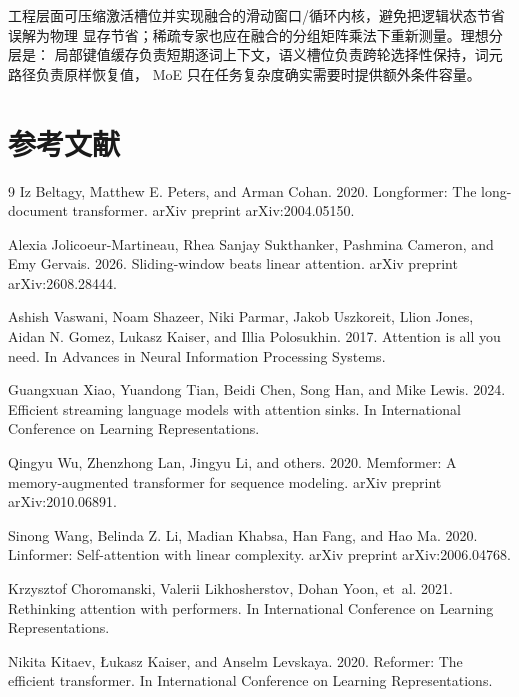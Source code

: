 \documentclass[letterpaper]{article}
\begin{document}
工程层面可压缩激活槽位并实现融合的滑动窗口/循环内核，避免把逻辑状态节省误解为物理
显存节省；稀疏专家也应在融合的分组矩阵乘法下重新测量。理想分层是：
局部键值缓存负责短期逐词上下文，语义槽位负责跨轮选择性保持，词元路径负责原样恢复值，
MoE 只在任务复杂度确实需要时提供额外条件容量。

\section*{参考文献}

\begin{thebibliography}{9}
Iz Beltagy, Matthew E. Peters, and Arman Cohan. 2020. Longformer: The long-document transformer. arXiv preprint arXiv:2004.05150.

Alexia Jolicoeur-Martineau, Rhea Sanjay Sukthanker, Pashmina Cameron, and Emy Gervais. 2026. Sliding-window beats linear attention. arXiv preprint arXiv:2608.28444.

Ashish Vaswani, Noam Shazeer, Niki Parmar, Jakob Uszkoreit, Llion Jones, Aidan N. Gomez, Lukasz Kaiser, and Illia Polosukhin. 2017. Attention is all you need. In Advances in Neural Information Processing Systems.

Guangxuan Xiao, Yuandong Tian, Beidi Chen, Song Han, and Mike Lewis. 2024. Efficient streaming language models with attention sinks. In International Conference on Learning Representations.

Qingyu Wu, Zhenzhong Lan, Jingyu Li, and others. 2020. Memformer: A memory-augmented transformer for sequence modeling. arXiv preprint arXiv:2010.06891.

Sinong Wang, Belinda Z. Li, Madian Khabsa, Han Fang, and Hao Ma. 2020. Linformer: Self-attention with linear complexity. arXiv preprint arXiv:2006.04768.

Krzysztof Choromanski, Valerii Likhosherstov, Dohan Yoon, et~al. 2021. Rethinking attention with performers. In International Conference on Learning Representations.

Nikita Kitaev, Łukasz Kaiser, and Anselm Levskaya. 2020. Reformer: The efficient transformer. In International Conference on Learning Representations.
\end{thebibliography}
\end{document}
